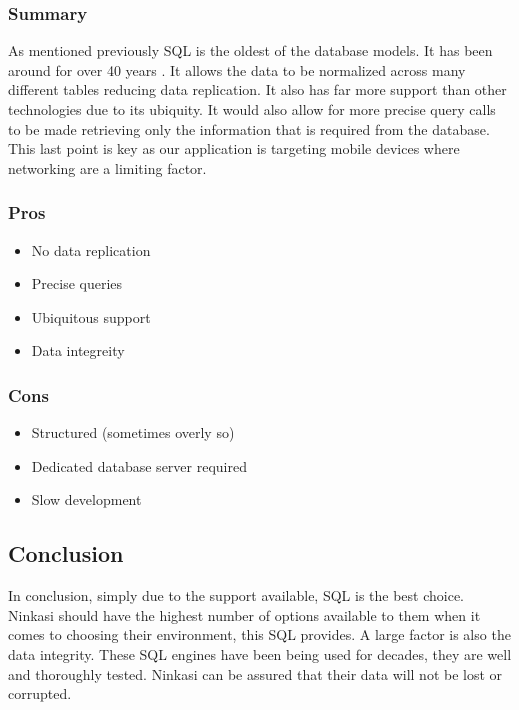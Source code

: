 \documentclass[draftclsnofoot,onecolumn,journal,letterpaper,compsoc,10pt]{IEEEtran}
\begin{document}
        \subsubsection{Summary}
        
        As mentioned previously SQL is the oldest of the database models.  It has been around for over 40 years \cite{sqlizer}.  It allows the data to be normalized across many different tables reducing data replication.  It also has far more support than other technologies due to its ubiquity.  It would also allow for more precise query calls to be made retrieving only the information that is required from the database.  This last point is key as our application is targeting mobile devices where networking are a limiting factor.
        
        \subsubsection{Pros}
        \begin{itemize}
            \item No data replication
            \item Precise queries
            \item Ubiquitous support
            \item Data integreity
        \end{itemize}
        
        \subsubsection{Cons}
        \begin{itemize}
            \item Structured (sometimes overly so)
            \item Dedicated database server required
            \item Slow development
        \end{itemize}
    
    \subsection{Conclusion}

    In conclusion, simply due to the support available, SQL is the best choice.  Ninkasi should have the highest number of options available to them when it comes to choosing their environment, this SQL provides.  A large factor is also the data integrity.  These SQL engines have been being used for decades, they are well and thoroughly tested.  Ninkasi can be assured that their data will not be lost or corrupted.
\end{document}
